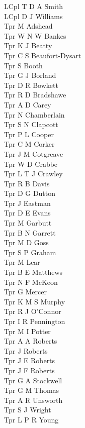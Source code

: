 \begin{multicols}{3}
  LCpl T D A Smith \\
  LCpl D J Williams \\
  Tpr M Adshead \\
  Tpr W N W Bankes \\
  Tpr K J Beatty \\
  Tpr C S Beaufort-Dysart \\
  Tpr S Booth \\
  Tpr G J Borland \\
  Tpr D R Bowkett \\
  Tpr R D Bradshawe \\
  Tpr A D Carey \\
  Tpr N Chamberlain \\
  Tpr S N Clapcott \\
  Tpr P L Cooper \\
  Tpr C M Corker \\
  Tpr J M Cotgreave \\
  Tpr W D Crabbe \\
  Tpr L T J Crawley \\
  Tpr R B Davis \\
  Tpr D G Dutton \\
  Tpr J Eastman \\
  Tpr D E Evans \\
  Tpr M Garbutt \\
  Tpr B N Garrett \\
  Tpr M D Goss \\
  Tpr S P Graham \\
  Tpr M Lear \\
  Tpr B E Matthews \\
  Tpr N F McKeon \\
  Tpr G Mercer \\
  Tpr K M S Murphy \\
  Tpr R J O'Connor \\
  Tpr I R Pennington \\
  Tpr M I Potter \\
  Tpr A A Roberts \\
  Tpr J Roberts \\
  Tpr J E Roberts \\
  Tpr J F Roberts \\
  Tpr G A Stockwell \\
  Tpr G M Thomas \\
  Tpr A R Unsworth \\
  Tpr S J Wright \\
  Tpr L P R Young \\

\end{multicols}
